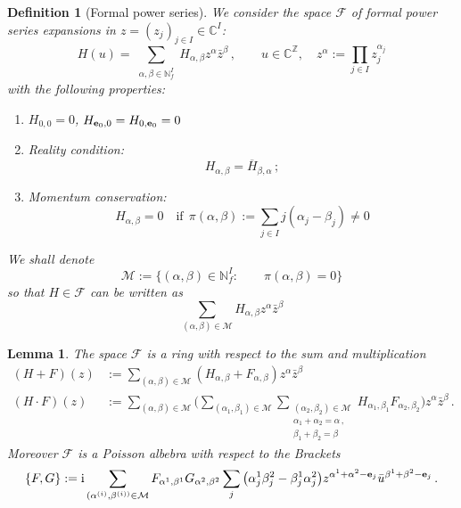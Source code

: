 \documentclass[reqno,11pt]{amsart}
\theoremstyle{plain}
\numberwithin{equation}{section}
\newtheorem{lemma}[theorem]{Lemma}
\newtheorem{defn}[thm]{Definition}
\newcommand{\N}{\mathbb{N}}
\newcommand{\Z}{\mathbb{Z}}
\newcommand{\C}{\mathbb{C}}
\newcommand{\bal}{{\bf \alpha}}
\newcommand{\bbt}{{\bf \beta}}
\newcommand{\be}{{\bf e}}
\newcommand{\cF}{{\mathcal F}}
\newcommand{\im}{{\rm i}}
\newcommand{\cM}{{\mathcal M}}
\newcommand{\set}[1]{{\left\{#1\right\}}}
\newcommand{\bcoeffu}[1]{#1_{\bal^{1},\bbt^{1}}}
\newcommand{\bcoeffd}[1]{#1_{\bal^{2},\bbt^{2}}}
\newcommand{\aluno}{\alpha^{1}}
\newcommand{\aldue}{\alpha^{2}}
\newcommand{\btuno}{\beta^{1}}
\newcommand{\btdue}{\beta^{2}}
\newcommand{\al}{{\alpha}}
\newcommand{\bt}{{\beta}}
\newcommand{\pa}[1]{{\left(#1\right)}}
\begin{document}
{\begin{defn}[Formal power series]\label{Hr}
	We consider the space $\cF$ of formal  power series expansions  %
	in $z=(z_j)_{j\in I}\in \C^I$:
	$$ 
	H(u)  = \sum_{\substack{\al,\bt\in\N^I_f} }H_{\al,\bt}z^\al \bar z^\bt\,,
	\qquad u\in \C^\Z,\quad
	z^\al:=\prod_{j\in I}z_j^{\al_j} 
	$$ 
	with the following properties: 
	\begin{enumerate}%
		\item $H_{0,0}= 0$, $H_{\be_0,0}= H_{0,\be_0}=0$ %
		\item Reality condition:
		\begin{equation}\label{real}
			H_{\al,\bt}= \overline{ H}_{\bt,\al}\,;
		\end{equation}
		\item Momentum conservation:
		\begin{equation}
			H_{\al,\bt}= 0 \quad\mbox{if}\;\, \pi(\al,\bt):= \sum_{j\in I} j(\al_j-\bt_j)\ne 0 \label{mconserv}
		\end{equation}%
	\end{enumerate}
	We shall denote 
	\[
	\cM:=\{(\al,\bt) \in \N^I_f:\qquad \pi(\al,\bt)=0\}
	\]
	so that $H\in \cF$ can be written as
	\[
	\sum_{(\al,\bt)\in \cM}H_{\al,\bt}z^\al \bar z^\bt
	\] 
	
\end{defn}

\begin{lemma}\label{anello}
	The space $\cF$ is a ring  with respect to the  sum and multiplication
	\[
	\begin{aligned}
		(H+F)(z) &:=  \sum_{(\al,\bt)\in \cM} (H_{\al,\bt}+ F_{\al,\bt}) z^\al \bar z^\bt \\
		(H \cdot F )(z) &:=  \sum_{(\al,\bt)\in \cM} \Big(\sum_{(\al_1,\bt_1) \in \cM} \sum_{\substack {(\al_2,\bt_2) \in \cM \\
				\al_1+\al_2=\al\,,\\ \bt_1+\bt_2=\bt}} H_{\al_1,\bt_1} F_{\al_2,\bt_2}\Big) z^\al \bar z^\bt\,.
	\end{aligned}
	\]
	Moreover $\cF$ is a Poisson albebra with respect to the Brackets
	\begin{equation}\label{well}
		\set{F,G} := \im\sum_{  (\al^{(i)},\bt^{(i))}\in\cM }  \bcoeffu{F}\bcoeffd{G} \sum_j \pa{\aluno_j \btdue_j  - \btuno_j \aldue_j }z^{\aluno + \aldue -\be_j}\bar{u}^{\btuno + \btdue - \be_j}\,.
	\end{equation}
	

\end{lemma}}
\end{document}
